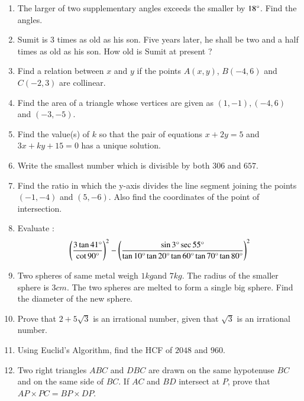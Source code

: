 \documentclass[12pt,-letter paper]{article}
\providecommand{\brak}[1]{\ensuremath{\left(#1\right)}}
\begin{document}
\begin{enumerate}
\item The larger of two supplementary angles exceeds the smaller by $18\degree$. Find the angles.

\item Sumit is $3$ times as old as his son. Five years later, he shall be two and a half times as old as his son. How old is Sumit at present ?

\item Find a relation between $x$ and $y$ if the points $A\brak{x, y}$, $B\brak{-4, 6} $ and $C\brak{-2, 3}$ are collinear.

\item Find the area of a triangle whose vertices are given as $\brak{1, - 1}, \brak{- 4, 6}$ and $\brak{ -3, - 5}$.

\item Find the value(s) of $k$ so that the pair of equations $x + 2y = 5$ and $3x + ky + 15 = 0$ has a unique solution.

\item Write the smallest number which is divisible by both $306$ and $657$.

\item Find the ratio in which the y-axis divides the line segment joining the points $\brak{-1, -4}$ and $\brak{5, -6}$. Also find the coordinates of the point of intersection.

\item Evaluate :
\begin{align*}
\left(\frac{3\tan 41\degree}{\cot 90\degree}\right)^2 - \left(\frac{\sin 3\degree \sec 55\degree}{\tan 10\degree \tan 20\degree \tan 60\degree \tan 70\degree \tan 80\degree}\right)^2
\end{align*}

\item Two spheres of same metal weigh $1 kg $and $7 kg$. The radius of the smaller sphere is $3 cm$. The two spheres are melted to form a single big sphere. Find the diameter of the new sphere.

\item Prove that $2+5\sqrt{3}$ is an irrational number, given that $\sqrt{3}$ is an irrational number.

\item Using Euclid's Algorithm, find the HCF of $2048$ and $960$.

\item Two right triangles $ABC$ and $DBC$ are drawn on the same hypotenuse $BC$ and on the same side of $BC$. If $AC$ and $BD$ intersect at $P$, prove that $AP \times PC = BP \times DP$.


\end{enumerate}
\end{document}

